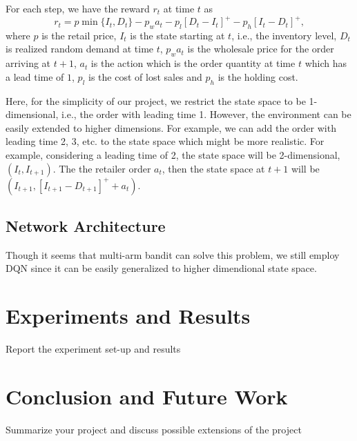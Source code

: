 For each step, we have the reward $r_t$ at time $t$ as
\begin{equation}
   r_t = p\min\{I_{t}, D_t\} - p_w a_t - p_l\left[D_t-I_t\right]^+ - p_h\left[I_t-D_t\right]^+,
\end{equation}
where $p$ is the retail price, $I_t$ is the state starting at $t$, i.e., the inventory level, $D_t$ is realized random demand at time $t$, $p_w a_t$ is the wholesale price for the order arriving at $t+1$, $a_t$ is the action which is the order quantity at time $t$ which has a lead time of $1$, $p_l$ is the cost of lost sales and $p_h$ is the holding cost. 

Here, for the simplicity of our project, we restrict the state space to be 1-dimensional, i.e., the order with leading time 1. However, the environment can be easily extended to higher dimensions. For example, we can add the order with leading time 2, 3, etc. to the state space which might be more realistic. For example, considering a leading time of 2, the state space will be 2-dimensional, $(I_t,I_{t+1})$. The the retailer order $a_t$, then the state space at $t+1$ will be $(I_{t+1},[I_{t+1}-D_{t+1}]^++a_t)$. 

\subsection{Network Architecture}
Though it seems that multi-arm bandit can solve this problem, we still employ DQN since it can be easily generalized to higher dimendional state space. 



\section{Experiments and Results}
Report the experiment set-up and results


\section{Conclusion and Future Work}
Summarize your project and discuss possible extensions of the project